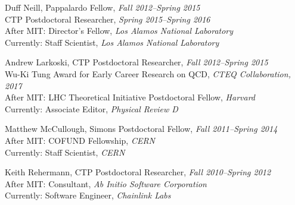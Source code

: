 \item Duff Neill, Pappalardo Fellow, \emph{Fall 2012--Spring 2015}
\\ CTP Postdoctoral Researcher, \emph{Spring 2015--Spring 2016}
\\ After MIT: Director's Fellow, \emph{Los Alamos National Laboratory}
\\ Currently: Staff Scientist, \emph{Los Alamos National Laboratory}

\item Andrew Larkoski, CTP Postdoctoral Researcher, \emph{Fall 2012--Spring 2015}
\\ Wu-Ki Tung Award for Early Career Research on QCD, \emph{CTEQ Collaboration, 2017}
\\ After MIT: LHC Theoretical Initiative Postdoctoral Fellow, \emph{Harvard}
\\ Currently: Associate Editor, \emph{Physical Review D}

\item Matthew McCullough, Simons Postdoctoral Fellow, \emph{Fall 2011--Spring 2014}
\\ After MIT: COFUND Fellowship, \emph{CERN}
\\ Currently: Staff Scientist, \emph{CERN}

\item Keith Rehermann, CTP Postdoctoral Researcher, \emph{Fall 2010--Spring 2012}
\\ After MIT: Consultant, \emph{Ab Initio Software Corporation}
\\ Currently: Software Engineer, \emph{Chainlink Labs}

\el

